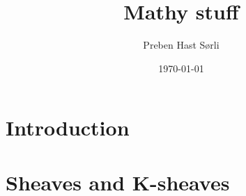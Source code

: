 \documentclass[british,titlepage]{ntnuthesis}
\title{Mathy stuff}
\author{Preben Hast Sørli}
\date{\today}
\begin{document}
\tableofcontents


\chapter{Introduction}

\chapter{Sheaves and K-sheaves}

\printbibliography
\end{document}
